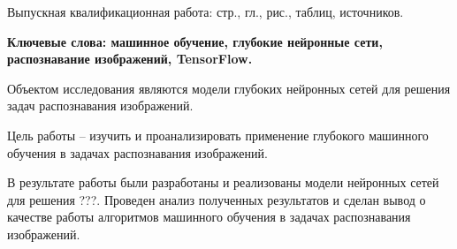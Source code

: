
Выпускная квалификационная работа: \pageref{LastPage} стр., 
 гл., 
\totalfigures{} рис.,
\totaltables{} таблиц,
 источников.

\textbf{Ключевые слова: машинное обучение, глубокие нейронные сети, распознавание изображений, TensorFlow.}

Объектом исследования являются модели глубоких нейронных сетей для решения задач распознавания изображений. 

Цель работы – изучить и проанализировать применение глубокого машинного обучения в задачах распознавания изображений.

В результате работы были разработаны и реализованы модели нейронных сетей для решения ???. Проведен анализ полученных результатов и сделан вывод о качестве работы алгоритмов машинного обучения в задачах распознавания изображений.

\clearpage